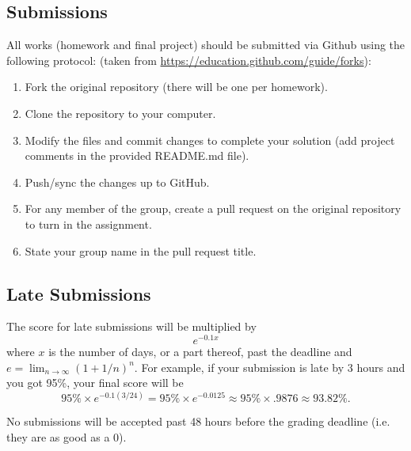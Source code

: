 \documentclass[10pt]{article}
\begin{document}
\subsection{Submissions}
All works (homework and final project) should be submitted via Github using the following protocol: (taken from \url{https://education.github.com/guide/forks}):
\begin{enumerate}[noitemsep]
	\item Fork the original repository (there will be one per homework).
	\item Clone the repository to your computer.
	\item Modify the files and commit changes to complete your solution (add project comments in the provided README.md file).
	\item Push/sync the changes up to GitHub.
	\item For any member of the group, create a pull request on the original repository to turn in the assignment.
	\item State your group name in the pull request title.
\end{enumerate}


\subsection{Late Submissions}
The score for late submissions will be multiplied by
$$
e^{-0.1x}
$$
where $x$ is the number of days, or a part thereof, past the deadline and $e = \lim_{n\rightarrow\infty}(1 + 1/n)^n$. For example, if your submission is late by 3 hours and you got 95\%, your final score will be
$$
95\% \times e^{-0.1(3/24)} = 95\% \times e^{-0.0125} \approx 95\% \times .9876 \approx 93.82\%.
$$

No submissions will be accepted past 48 hours before the grading deadline (i.e. they are as good as a 0).
\end{document}

